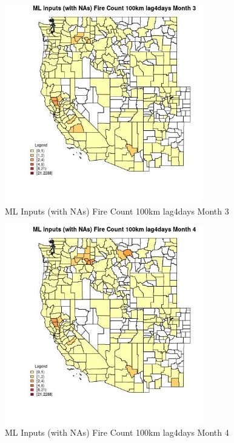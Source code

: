 \begin{figure} 
\centering  
\includegraphics[width=0.77\textwidth]{Code_Outputs/Report_ML_input_PM25_Step4_part_e_de_duplicated_aves_compiled_2019-05-21wNAs_CountyFire_Count_100km_lag4daysmedianMonth3.jpg} 
\caption{\label{fig:Report_ML_input_PM25_Step4_part_e_de_duplicated_aves_compiled_2019-05-21wNAsCountyFire_Count_100km_lag4daysmedianMonth3}ML Inputs (with NAs) Fire Count 100km lag4days Month 3} 
\end{figure} 
 

\begin{figure} 
\centering  
\includegraphics[width=0.77\textwidth]{Code_Outputs/Report_ML_input_PM25_Step4_part_e_de_duplicated_aves_compiled_2019-05-21wNAs_CountyFire_Count_100km_lag4daysmedianMonth4.jpg} 
\caption{\label{fig:Report_ML_input_PM25_Step4_part_e_de_duplicated_aves_compiled_2019-05-21wNAsCountyFire_Count_100km_lag4daysmedianMonth4}ML Inputs (with NAs) Fire Count 100km lag4days Month 4} 
\end{figure} 
 

